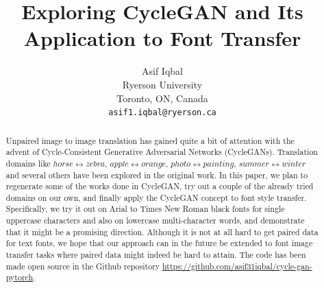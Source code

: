 \documentclass[10pt,twocolumn,letterpaper]{article}
\begin{document}
\title{Exploring CycleGAN and Its Application to Font Transfer}

\author{Asif Iqbal\\
Ryerson University\\
Toronto, ON, Canada\\
{\tt\small asif1.iqbal@ryerson.ca}
}

\maketitle

\begin{abstract}
   Unpaired image to image translation has gained quite a bit of attention with the advent of Cycle-Consistent Generative Adversarial Networks (CycleGANs). Translation domains like $horse \leftrightarrow zebra$, $apple \leftrightarrow orange$, $photo \leftrightarrow painting$, $summer \leftrightarrow winter$ and several others have been explored in the original work. In this paper, we plan to regenerate some of the works done in CycleGAN, try out a couple of the already tried domains on our own, and finally apply the CycleGAN concept to font style transfer. Specifically, we try it out on Arial to Times New Roman black fonts for single uppercase characters and also on lowercase multi-character words, and demonstrate that it might be a promising direction. Although it is not at all hard to get paired data for text fonts, we hope that our approach can in the future be extended to font image transfer tasks where paired data might indeed be hard to attain. The code has been made open source in the Github repository \href{https://github.com/asif31iqbal/cycle-gan-pytorch}{https://github.com/asif31iqbal/cycle-gan-pytorch}.
\end{abstract}

\end{document}
